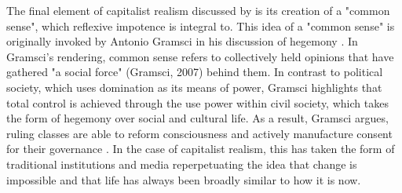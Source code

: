 The final element of capitalist realism discussed by \citet{shonkwiler_reading_2014} is its creation of a "common sense", which reflexive impotence is integral to. This idea of a "common sense" is originally invoked by Antonio Gramsci in his discussion of hegemony \citep{gramsci_selections_2007}. In Gramsci's rendering, common sense refers to collectively held opinions that have gathered "a social force" (Gramsci, 2007) behind them. In contrast to political society, which uses domination as its means of power, Gramsci highlights that total control is achieved through the use power within civil society, which takes the form of hegemony over social and cultural life. As a result, Gramsci argues, ruling classes are able to reform consciousness \citep[]{gramsci_selections_2007} and actively manufacture consent for their governance \citep[39]{harvey_brief_2007}. In the case of capitalist realism, this has taken the form of traditional institutions and media reperpetuating the idea that change is impossible and that life has always been broadly similar to how it is now. 

